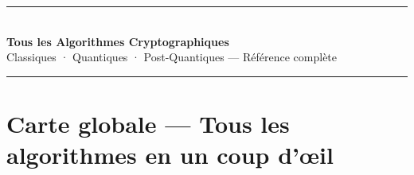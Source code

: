 \documentclass[12pt, a4paper]{article}
\begin{document}

\begin{center}
  {\color{suva_blue}\rule{\textwidth}{2pt}}\\[0.4cm]
  {\Huge\bfseries\color{suva_blue} Tous les Algorithmes Cryptographiques}\\[0.2cm]
  {\large\color{gray} Classiques · Quantiques · Post-Quantiques --- Référence complète}\\[0.4cm]
  {\color{suva_blue}\rule{\textwidth}{0.5pt}}
\end{center}

\tableofcontents
\newpage

\section*{Carte globale --- Tous les algorithmes en un coup d'œil}
\end{document}
